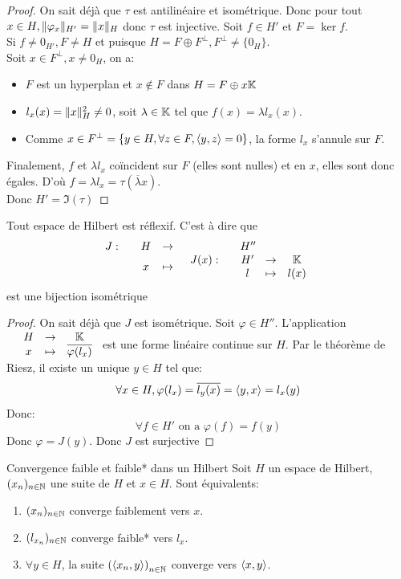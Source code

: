 \documentclass[]{report}
\begin{document}
    \begin{proof}
        On sait déjà que $\tau$ est antilinéaire et isométrique. Donc pour tout $x\in H,\lVert \varphi_x \rVert_{H'}=\lVert x \rVert_H$ donc $\tau $ est injective. Soit $f\in H'$ et $F=\ker f$.\\
        Si $f\neq 0_{H'}, F\neq H$ et puisque $H=F\oplus F^\perp,F^\perp\neq \{0_H\}$.\\
        Soit $x\in F^\perp,x\neq 0_H$, on a:
        \begin{itemize}
            \item $F$ est un hyperplan et $x\notin F$ dans $H=F\oplus x\mathbb{K}$
            \item $l_x(x)=\lVert x \rVert_H^2\neq 0$, soit $\lambda \in \mathbb{K}$ tel que $f(x)=\lambda l_x(x)$.
            \item Comme $x\in F^\perp=\{y\in H,\forall z\in F, \langle y,z \rangle=0\}$, la forme $l_x$ s'annule sur $F$.
        \end{itemize}
        Finalement, $f$ et $\lambda l_x$ coïncident sur $F$ (elles sont nulles) et en $x$, elles sont donc égales. D'où $f=\lambda l_x=\tau(\overline{\lambda}x)$.\\
        Donc $H'=\Im (\tau)$
    \end{proof}

    \begin{cor}{}{}
        Tout espace de Hilbert est réflexif. C'est à dire que
        \[\begin{array}{ccccc} J : & & H & \to & H'' \\ & & x & \mapsto & \begin{array}{ccccc} J(x) : & & H' & \to & \mathbb{K} \\ & & l & \mapsto & l(x) \end{array} \end{array}\]
        est une bijection isométrique
    \end{cor}

    \begin{proof}
        On sait déjà que $J$ est isométrique. Soit $\varphi\in H''$. L'application $\begin{array}{ccccc} & H & \to & \mathbb{K} \\ & x & \mapsto & \overline{\varphi(l_x)} \end{array}$ est une forme linéaire continue sur $H$. Par le théorème de Riesz, il existe un unique $y\in H$ tel que:
        \[\forall x\in H, \varphi(l_x)=\overline{l_y(x)}=\langle y,x \rangle=l_x(y)\]
        Donc:
        \[\forall f\in H'\text{ on a }\varphi(f)=f(y)\]
        Donc $\varphi=J(y)$. Donc $J$ est surjective
    \end{proof}

    \begin{cor}{Convergence faible et faible* dans un Hilbert}{}
        Soit $H$ un espace de Hilbert, $(x_n)_{n\in\mathbb{N}}$ une suite de $H$ et $x\in H$. Sont équivalents:
        \begin{enumerate}
            \item $(x_n)_{n\in\mathbb{N}}$ converge faiblement vers $x$.
            \item $(l_{x_n})_{n\in\mathbb{N}}$ converge faible* vers $l_x$.
            \item $\forall y\in H$, la suite $\left(\langle x_n,y \rangle\right)_{n\in\mathbb{N}}$ converge vers $\langle x,y \rangle$.
        \end{enumerate}
    \end{cor}
\end{document}
